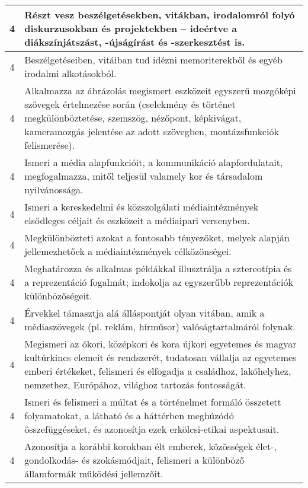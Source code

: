 \begin{longtable}{c | p{12cm} }
                                          4 &  Részt vesz beszélgetésekben, vitákban, irodalomról folyó diskurzusokban és projektekben – ideértve a diákszínjátszást, -újságírást és -szerkesztést is. \\ \hline
                                          4 &  Beszélgetéseiben, vitáiban tud idézni memoriterekből és egyéb irodalmi alkotásokból. \\ \hline
                                          4 &  Alkalmazza az ábrázolás megismert eszközeit egyszerű mozgóképi szövegek értelmezése során (cselekmény és történet megkülönböztetése, szemszög, nézőpont, képkivágat, kameramozgás jelentése az adott szövegben, montázsfunkciók felismerése). \\ \hline
                                          4 &  Ismeri a média alapfunkcióit, a kommunikáció alapfordulatait, megfogalmazza, mitől teljesül valamely kor és társadalom nyilvánossága. \\ \hline
                                          4 &  Ismeri a kereskedelmi és közszolgálati médiaintézmények elsődleges céljait és eszközeit a médiaipari versenyben. \\ \hline
                                          4 &  Megkülönbözteti azokat a fontosabb tényezőket, melyek alapján jellemezhetőek a médiaintézmények célközönségei. \\ \hline
                                          4 &  Meghatározza és alkalmas példákkal illusztrálja a sztereotípia és a reprezentáció fogalmát; indokolja az egyszerűbb reprezentációk különbözőségeit. \\ \hline
                                          4 &  Érvekkel támasztja alá álláspontját olyan vitában, amik a médiaszövegek (pl. reklám, hírműsor) valóságtartalmáról folynak. \\ \hline
                                          4 &  Megismeri az ókori, középkori és kora újkori egyetemes és magyar kultúrkincs elemeit és rendszerét, tudatosan vállalja az egyetemes emberi értékeket, felismeri és elfogadja a családhoz, lakóhelyhez, nemzethez, Európához, világhoz tartozás fontosságát. \\ \hline
                                          4 &  Ismeri és felismeri a múltat és a történelmet formáló összetett folyamatokat, a látható és a háttérben meghúzódó összefüggéseket, és azonosítja ezek erkölcsi-etikai aspektusait. \\ \hline
                                          4 &  Azonosítja a korábbi korokban élt emberek, közösségek élet-, gondolkodás- és szokásmódjait, felismeri a különböző államformák működési jellemzőit. \\ \hline

\end{longtable}
